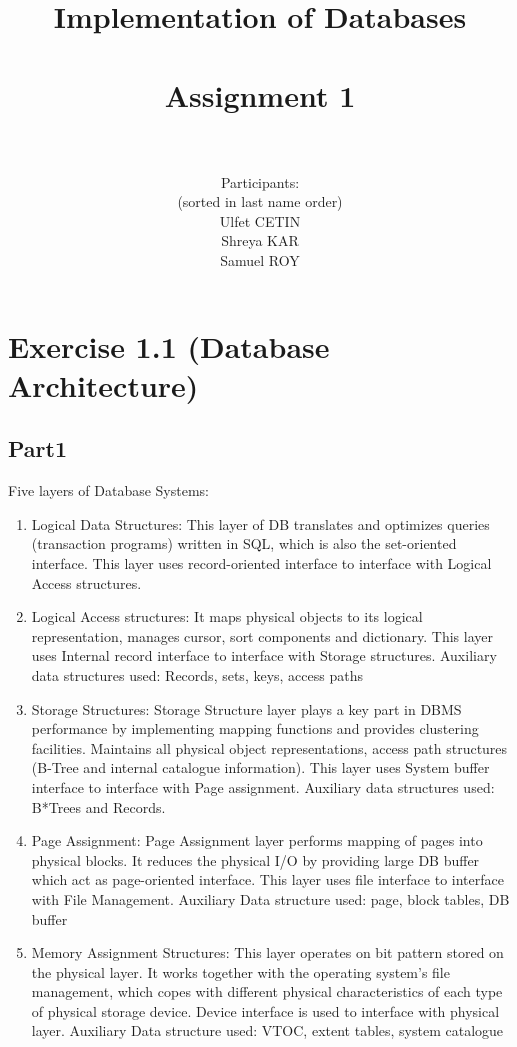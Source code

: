 \documentclass[10pt]{article}
\title{Implementation of Databases \\ ~~~ \\ Assignment 1 \\ ~~~ \\ }
\author{
	Participants:\\
	(sorted in last name order)\\
	Ulfet CETIN\\ 
	Shreya KAR\\
	Samuel ROY\\	
}
\date{}
\begin{document}
	\maketitle
	
	\clearpage
	
	\section*{Exercise 1.1 (Database Architecture)}
	
		\subsection*{Part1}
		Five layers of Database Systems:
		
		\begin{enumerate}
			\item Logical Data Structures:
			This layer of DB translates and optimizes queries (transaction programs) written in SQL, which is also the set-oriented interface. This layer uses record-oriented interface to interface with Logical Access structures.
			
			\item Logical Access structures:
			It maps physical objects to its logical representation, manages cursor, sort components and dictionary. This layer uses Internal record interface to interface with Storage structures. Auxiliary data structures used: Records, sets, keys, access paths 
			
			\item Storage Structures:
			Storage Structure layer plays a key part in DBMS performance by implementing mapping functions and provides clustering facilities. Maintains all physical object representations, access path structures (B-Tree and internal catalogue information). This layer uses System buffer interface to interface with Page assignment. Auxiliary data structures used: B*Trees and Records.
			
			\item Page Assignment:
			Page Assignment layer performs mapping of pages into physical blocks. It reduces the physical I/O by providing large DB buffer which act as page-oriented interface. This layer uses file interface to interface with File Management. Auxiliary Data structure used: page, block tables, DB buffer
			
			\item Memory Assignment Structures:
			This layer operates on bit pattern stored on the physical layer. It works together with the operating system’s file management, which copes with different physical characteristics of each type of physical storage device. Device interface is used to interface with physical layer. Auxiliary Data structure used: VTOC, extent tables, system catalogue
			
			
		\end{enumerate}
		
\end{document}
